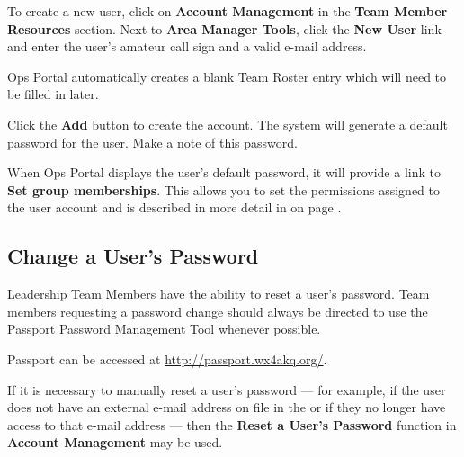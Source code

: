 \documentclass[pdflatex,letterpaper,twoside,12pt]{book}
\begin{document}
To create a new user, click on \textbf{Account Management} in the \textbf{Team Member Resources} section.  Next to \textbf{Area Manager Tools}, click the \textbf{New User} link and enter the user's amateur call sign and a valid e-mail address.



Ops Portal automatically creates a blank Team Roster entry which will need to be filled in later.

Click the \textbf{Add} button to create the account.  The system will generate a default password for the user.  Make a note of this password.

When Ops Portal displays the user's default password, it will provide a link to \textbf{Set group memberships}.  This allows you to set the permissions assigned to the user account and is described in more detail in  on page \pageref{ops-manage-groups}.

\subsection{Change a User's Password}\label{ops-change-user-password}

Leadership Team Members have the ability to reset a user's password.  Team members requesting a password change should always be directed to use the Passport Password Management Tool whenever possible.

Passport can be accessed at \url{http://passport.wx4akq.org/}.

If it is necessary to manually reset a user's password --- for example, if the user does not have an external e-mail address on file in the  or if they no longer have access to that e-mail address --- then the \textbf{Reset a User's Password} function in \textbf{Account Management} may be used.
\end{document}
